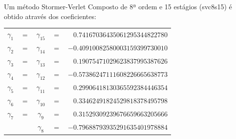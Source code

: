 \begin{method}[svcp8s15]\label{metodo:svcp8s15}\citep[157]{Hairer2006-oz}
    Um método Stormer-Verlet Composto de 8ª ordem e 15 estágios (svc8s15) é obtido através dos coeficientes:
    \begin{center}
        \begin{tabular}{ccccr}        
        $\gamma_1$ &$=$& $\gamma_{15}$ &$=$& $0.74167036435061295344822780$ \\
        $\gamma_2$ &$=$& $\gamma_{14}$ &$=$& $-0.40910082580003159399730010$ \\
        $\gamma_3$ &$=$& $\gamma_{13}$ &$=$& $0.19075471029623837995387626$ \\
        $\gamma_4$ &$=$& $\gamma_{12}$ &$=$& $-0.57386247111608226665638773$ \\
        $\gamma_5$ &$=$& $\gamma_{11}$ &$=$& $0.29906418130365592384446354$ \\
        $\gamma_6$ &$=$& $\gamma_{10}$ &$=$& $0.33462491824529818378495798$ \\
        $\gamma_7$ &$=$& $\gamma_{9}$  &$=$& $0.31529309239676659663205666$ \\
                   &   & $\gamma_{8}$  &$=$& $-0.79688793935291635401978884$ \\
        \end{tabular}
    \end{center}
\end{method}

